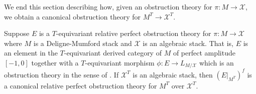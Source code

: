 \documentclass[12pt,dvipsnames]{amsart}
\begin{document}
We end this section describing how, given an obstruction theory for \(\pi:M\to \mathcal X\), we obtain a canonical obstruction theory for \(M^T\to \mathcal X^T\).
\begin{lemma}\label{rl-000G}\label{lem:obstruction-theory-for-the-fixed-locus}
  Suppose \(E\) is a \(T\)-equivariant relative perfect obstruction theory for \(\pi:M\to \mathcal X\) where \(M\) is a Deligne-Mumford stack and \(\mathcal X\) is an algebraic stack. That is, \(E\) is an element in the \(T\)-equivariant derived category of \(M\) of perfect amplitude \([-1,0]\) together with a \(T\)-equivariant morphism \(\phi: E\to L_{M/\mathcal X}\) which is an obstruction theory in the sense of \cite[Definition 4.4]{behrend-fantechi_IntrinsicNormalCone1997}. If \(\mathcal X^T\) is an algebraic stack, then \((E|_{M^T})^f\) is a canonical relative perfect obstruction theory for \(M^T\) over \(\mathcal X^T\).
\end{lemma}
\end{document}
